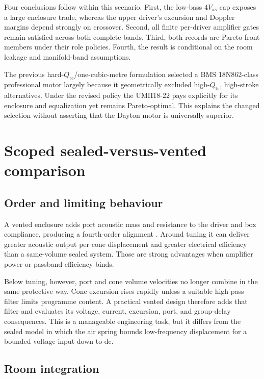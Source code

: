 \documentclass[11pt,a4paper]{article}
\numberwithin{equation}{section}
\newcommand{\Qts}{Q_{\mathrm{ts}}}
\newcommand{\Qtc}{Q_{\mathrm{tc}}}
\newcommand{\Vas}{V_{\mathrm{as}}}
\begin{document}


Four conclusions follow within this scenario.  First, the low-bass
$4\Vas$ cap exposes a large enclosure trade, whereas the upper driver's
excursion and Doppler margins depend strongly on crossover.  Second, all
finite per-driver amplifier gates remain satisfied across both complete
bands.  Third, both records are Pareto-front members under their role
policies.  Fourth, the result is conditional on the room leakage and
manifold-band assumptions.

The previous hard-$\Qtc$/one-cubic-metre formulation selected a BMS
18N862-class professional motor largely because it geometrically excluded
high-$\Qts$, high-stroke alternatives.  Under the revised policy the
UMII18-22 pays explicitly for its enclosure and equalization yet remains
Pareto-optimal.  This explains the changed selection without asserting that
the Dayton motor is universally superior.

\section{Scoped sealed-versus-vented comparison}
\label{sec:vented}

\subsection{Order and limiting behaviour}

A vented enclosure adds port acoustic mass and resistance to the driver and
box compliance, producing a fourth-order alignment \cite{small1973vented}.
Around tuning it can deliver greater acoustic output per cone displacement
and greater electrical efficiency than a same-volume sealed system.  Those
are strong advantages when amplifier power or passband efficiency binds.

Below tuning, however, port and cone volume velocities no longer combine in
the same protective way.  Cone excursion rises rapidly unless a suitable
high-pass filter limits programme content.  A practical vented design
therefore adds that filter and evaluates its voltage, current, excursion,
port, and group-delay consequences.  This is a manageable engineering task,
but it differs from the sealed model in which the air spring bounds
low-frequency displacement for a bounded voltage input down to dc.

\subsection{Room integration}
\end{document}
